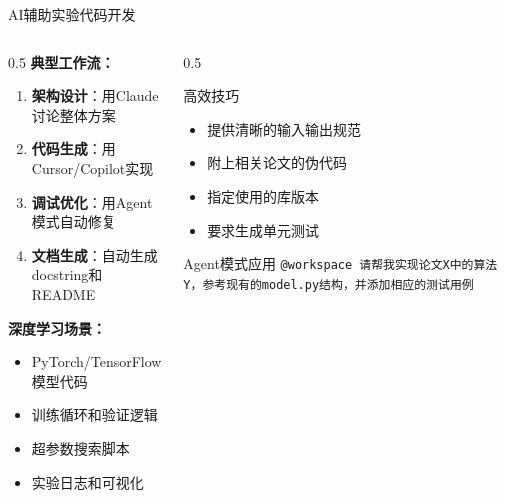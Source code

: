 \documentclass[aspectratio=169,11pt]{beamer}
\begin{document}
\begin{frame}{AI辅助实验代码开发}
    \begin{columns}
        \begin{column}{0.5\textwidth}
            \textbf{典型工作流：}
            \begin{enumerate}
                \item \textbf{架构设计}：用Claude讨论整体方案
                \item \textbf{代码生成}：用Cursor/Copilot实现
                \item \textbf{调试优化}：用Agent模式自动修复
                \item \textbf{文档生成}：自动生成docstring和README
            \end{enumerate}
            
            \vspace{0.3cm}
            \textbf{深度学习场景：}
            \begin{itemize}
                \item PyTorch/TensorFlow模型代码
                \item 训练循环和验证逻辑
                \item 超参数搜索脚本
                \item 实验日志和可视化
            \end{itemize}
        \end{column}
        \begin{column}{0.5\textwidth}
            \begin{block}{高效技巧}
                \begin{itemize}
                    \item 提供清晰的输入输出规范
                    \item 附上相关论文的伪代码
                    \item 指定使用的库版本
                    \item 要求生成单元测试
                \end{itemize}
            \end{block}
            
            \vspace{0.3cm}
            \begin{alertblock}{Agent模式应用}
                \texttt{@workspace 请帮我实现论文X中的算法Y，参考现有的model.py结构，并添加相应的测试用例}
            \end{alertblock}
        \end{column}
    \end{columns}
\end{frame}
\end{document}
